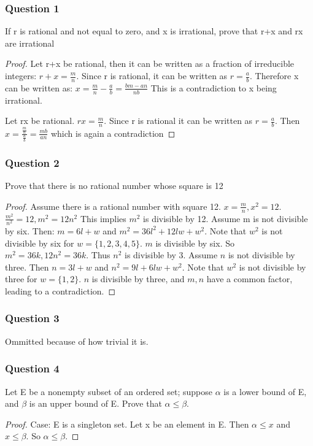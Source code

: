 \documentclass[12pt, letterpaper]{paper}
\begin{document}
\subsubsection{Question 1}
\label{sec:org9e9c36f}
\begin{question}
  If r is rational and not equal to zero, and x is irrational, prove
  that r+x and rx are irrational
\end{question}
\begin{proof}
  Let r+x be rational, then it can be written as a fraction of
  irreducible integers: $r+x = \frac{m}{n}$. Since r is rational, it
  can be written as $r = \frac{a}{b}$.  Therefore x can be written as:
  $x = \frac{m}{n} - \frac{a}{b} = \frac{bm - an}{nb}$ This is a
  contradiction to x being irrational.

  Let rx be rational. $rx = \frac{m}{n}$. Since r is rational it can
  be written as $r = \frac{a}{b}$.  Then
  $x = \frac{\frac{m}{n}}{\frac{a}{b}} = \frac{mb}{an}$ which is again
  a contradiction
\end{proof}

\subsubsection{Question 2}
\label{sec:org534551b}
\begin{question}
  Prove that there is no rational number whose square is 12
\end{question}
\begin{proof}
  Assume there is a rational number with square 12.
  $x = \frac{m}{n}, x^2 = 12$.  $\frac{m^2}{n^2} = 12, m^2 = 12n^2$
  This implies $m^2$ is divisible by 12.  Assume m is not divisible by
  six. Then: $m = 6l + w$ and $m^2 = 36l^2 + 12lw + w^2$.  Note that
  $w^2$ is not divisible by six for $w = \{1,2,3,4,5\}$.  $m$ is
  divisible by six. So $m^2 = 36k, 12n^2 = 36k$. Thus $n^2$ is
  divisible by 3.  Assume $n$ is not divisible by three. Then
  $n = 3l + w$ and $n^2 = 9l + 6lw + w^2$.  Note that $w^2$ is not
  divisible by three for $w = \{1,2\}$.  $n$ is divisible by three,
  and $m,n$ have a common factor, leading to a contradiction.
\end{proof}

\subsubsection{Question 3}
\label{sec:org1c15d6f}
Ommitted because of how trivial it is.

\subsubsection{Question 4}
\label{sec:orgc442add}
\begin{question}
  Let E be a nonempty subset of an ordered set; suppose $\alpha$ is a
  lower bound of E, and $\beta$ is an upper bound of E. Prove that
  $\alpha \leq \beta$.
\end{question}
\begin{proof}
  Case: E is a singleton set. Let x be an element in E. Then
  $\alpha \leq x$ and $x \leq \beta$. So $\alpha \leq \beta$.
\end{proof}
\end{document}

